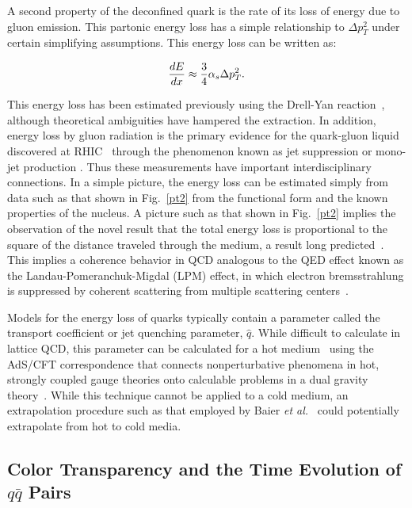 A second property of the deconfined quark is the rate of its loss of
energy due to gluon emission. This partonic energy loss has a simple
relationship to $\Delta p_T^2$ under certain simplifying assumptions.
This energy loss can be written as:

\begin{equation}
{dE\over{dx}} \approx \frac{3}{4} \alpha_s \Delta p_T^2.
\end{equation}

\noindent
This energy loss has been estimated previously using the Drell-Yan
reaction~\cite{DY1,DY2}, although theoretical ambiguities have hampered the
extraction.  In addition, energy loss by gluon radiation is the primary 
evidence for the quark-gluon liquid discovered at RHIC~\cite{RHIC} 
through the phenomenon known as jet suppression or mono-jet production
\cite{STAR}. Thus these measurements have important interdisciplinary 
connections. In a simple picture, the energy loss can be estimated
simply from data such as that shown in Fig.~\ref{pt2} from the functional 
form and the known properties of the nucleus.  A picture such as that 
shown in Fig.~\ref{pt2} implies the observation of the novel result that 
the total energy loss is proportional to the square of the distance 
traveled through the medium, a result long predicted~\cite{BDPS}.  This 
implies a coherence behavior in QCD analogous to the QED effect known as 
the Landau-Pomeranchuk-Migdal (LPM) effect, in which electron
bremsstrahlung is suppressed by coherent scattering from multiple
scattering centers~\cite{LPM1,LPM2,Migdal}. 

Models for the energy loss of quarks typically contain a parameter called 
the transport coefficient or jet quenching parameter, $\hat{q}$.  While 
difficult to calculate in lattice QCD, this parameter can be calculated 
for a hot medium~\cite{LRW} using the AdS/CFT correspondence that 
connects nonperturbative phenomena in hot, strongly coupled gauge theories 
onto calculable problems in a dual gravity theory~\cite{ADSCFT1,ADSCFT2,ADSCFT3}.
While this technique cannot be applied to a cold medium, an extrapolation 
procedure such as that employed by Baier {\it et al.}~\cite{BAIER1,BAIER2} could 
potentially extrapolate from hot to cold media. 

\boldmath
\subsection{Color Transparency and the Time Evolution of $q\bar{q}$ Pairs}
\unboldmath

